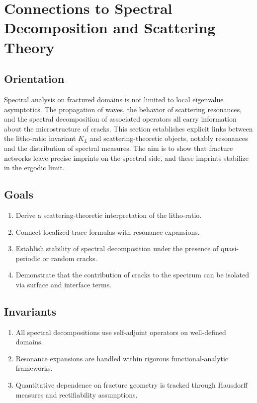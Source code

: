 \section{Connections to Spectral Decomposition and Scattering Theory}

\subsection*{Orientation}
Spectral analysis on fractured domains is not limited to local eigenvalue 
asymptotics. The propagation of waves, the behavior of scattering resonances, 
and the spectral decomposition of associated operators all carry information 
about the microstructure of cracks. This section establishes explicit links 
between the litho-ratio invariant $K_L$ and scattering-theoretic objects, 
notably resonances and the distribution of spectral measures. The aim is to 
show that fracture networks leave precise imprints on the spectral side, and 
these imprints stabilize in the ergodic limit.

\subsection*{Goals}
\begin{enumerate}[label=G\arabic*]
  \item Derive a scattering-theoretic interpretation of the litho-ratio.
  \item Connect localized trace formulas with resonance expansions.
  \item Establish stability of spectral decomposition under the presence of 
  quasi-periodic or random cracks.
  \item Demonstrate that the contribution of cracks to the spectrum can be 
  isolated via surface and interface terms.
\end{enumerate}

\subsection*{Invariants}
\begin{enumerate}[label=I\arabic*]
  \item All spectral decompositions use self-adjoint operators on well-defined 
  domains.
  \item Resonance expansions are handled within rigorous functional-analytic 
  frameworks.
  \item Quantitative dependence on fracture geometry is tracked through 
  Hausdorff measures and rectifiability assumptions.
\end{enumerate}

